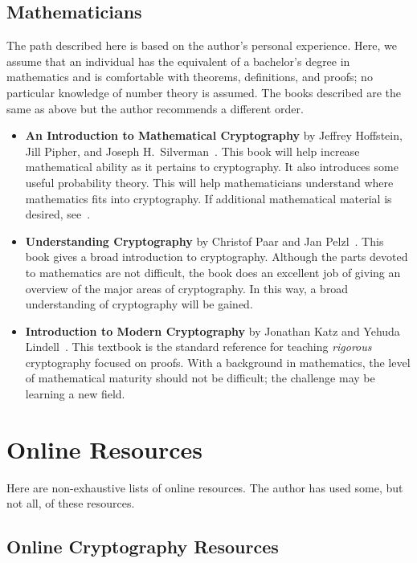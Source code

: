 \subsection{Mathematicians}

The path described here is based on the author's personal experience.
Here, we assume that an individual has the equivalent of a bachelor's
degree in mathematics and is comfortable with theorems,
definitions, and proofs;
no particular knowledge of \gls{number theory} is assumed.
The books described are the same as above but the author recommends
a different order.

\begin{itemize}
\item \textbf{An Introduction to Mathematical Cryptography}
    by Jeffrey Hoffstein, Jill Pipher,
    and Joseph H.~Silverman~\cite{IntroMathCrypto}.
    This book will help increase mathematical ability as it pertains
    to cryptography.
    It also introduces some useful probability theory.
    This will help mathematicians understand where mathematics
    fits into cryptography.
    If additional mathematical material is desired,
    see~\cite{ComputationalIntroNTA}.
\item \textbf{Understanding Cryptography} by Christof Paar
    and Jan Pelzl~\cite{UnderstandingCrypto}.
    This book gives a broad introduction to cryptography.
    Although the parts devoted to mathematics are not difficult,
    the book does an excellent job of giving an overview of the major
    areas of cryptography.
    In this way, a broad understanding of cryptography will be gained.
\item \textbf{Introduction to Modern Cryptography}
    by Jonathan Katz and Yehuda Lindell~\cite{IntroModernCrypto}.
    This textbook is the standard reference for teaching \emph{rigorous}
    cryptography focused on proofs.
    With a background in mathematics, the level of mathematical maturity
    should not be difficult;
    the challenge may be learning a new field.
\end{itemize}

\section{Online Resources}

Here are non-exhaustive lists of online resources.
The author has used some, but not all, of these resources.

\subsection{Online Cryptography Resources}

